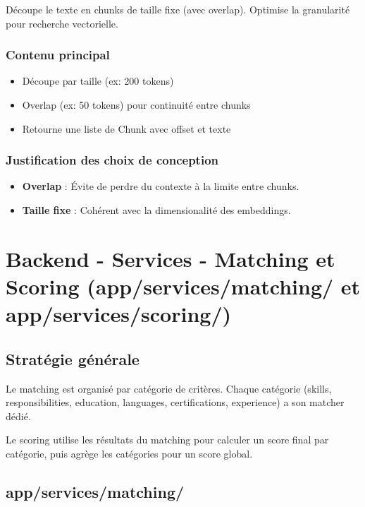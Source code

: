 \documentclass[12pt,a4paper,oneside]{book}
\begin{document}
Découpe le texte en chunks de taille fixe (avec overlap). Optimise la granularité pour recherche vectorielle.

\subsubsection{Contenu principal}

\begin{itemize}
    \item Découpe par taille (ex: 200 tokens)
    \item Overlap (ex: 50 tokens) pour continuité entre chunks
    \item Retourne une liste de Chunk avec offset et texte
\end{itemize}

\subsubsection{Justification des choix de conception}

\begin{itemize}
    \item \textbf{Overlap} : Évite de perdre du contexte à la limite entre chunks.
    
    \item \textbf{Taille fixe} : Cohérent avec la dimensionalité des embeddings.
\end{itemize}

\newpage

\section{Backend - Services - Matching et Scoring (app/services/matching/ et app/services/scoring/)}

\subsection{Stratégie générale}

Le matching est organisé par catégorie de critères. Chaque catégorie (skills, responsibilities, education, languages, certifications, experience) a son matcher dédié.

Le scoring utilise les résultats du matching pour calculer un score final par catégorie, puis agrège les catégories pour un score global.

\subsection{app/services/matching/}
\end{document}
